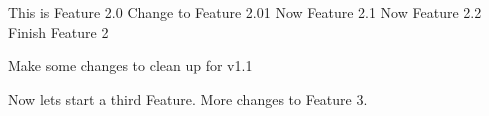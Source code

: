 This is Feature 2.0
Change to Feature 2.01
Now Feature 2.1
Now Feature 2.2
Finish Feature 2

Make some changes to clean up for v1.1

Now lets start a third Feature.
More changes to Feature 3.
